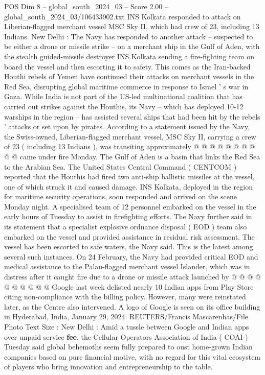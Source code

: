 \begin{textsample}{POS Dim 8 – global\_south\_2024\_03 – Score 2.00 – global\_south\_2024\_03/106433902.txt}  \label{ex:f8_pos_430}
INS Kolkata responded to attack on Liberian-flagged merchant vessel MSC Sky II, which had crew of 23, including 13 Indians.
New Delhi : The Navy has responded to another attack -- suspected to be either a drone or missile strike -- on a merchant ship in the Gulf of Aden, with the stealth guided-missile destroyer INS Kolkata sending a fire-fighting team on board the vessel and then escorting it to safety.
This comes as the Iran-backed Houthi rebels of Yemen have continued their attacks on merchant vessels in the Red Sea, disrupting global maritime commerce in response to Israel ' s war in Gaza.
While India is not part of the US-led multinational coalition that has carried out strikes against the Houthis, its Navy -- which has deployed 10-12 warships in the region -- has assisted several ships that had been hit by the rebels ' attacks or set upon by pirates.
According to a statement issued by the Navy, the Swiss-owned, Liberian-flagged merchant vessel, MSC Sky II, carrying a crew of 23 ( including 13 Indians ), was transiting approximately @ @ @ @ @ @ @ @ @ @ came under fire Monday.
The Gulf of Aden is a basin that links the Red Sea to the Arabian Sea.
The United States Central Command ( CENTCOM ) reported that the Houthis had fired two anti-ship ballistic missiles at the vessel, one of which struck it and caused damage.
INS Kolkata, deployed in the region for maritime security operations, soon responded and arrived on the scene Monday night.
A specialised team of 12 personnel embarked on the vessel in the early hours of Tuesday to assist in firefighting efforts.
The Navy further said in its statement that a specialist explosive ordnance disposal ( EOD ) team also embarked on the vessel and provided assistance in residual risk assessment.
The vessel has been escorted to safe waters, the Navy said.
This is the latest among several such instances.
On 24 February, the Navy had provided critical EOD and medical assistance to the Palau-flagged merchant vessel Islander, which was in distress after it caught fire due to a drone or missile attack launched by @ @ @ @ @ @ @ @ @ @ Google last week delisted nearly 10 Indian apps from Play Store citing non-compliance with the billing policy.
However, many were reinstated later, as the Centre also intervened.
A logo of Google is seen on its office building in Hyderabad, India, January 29, 2024.
REUTERS/Francis Mascarenhas/File Photo Text Size : New Delhi : Amid a tussle between Google and Indian apps over unpaid service \textbf{fee}, the Cellular Operators Association of India ( COAI ) Tuesday said global behemoths seem fully prepared to oust home-grown Indian companies based on pure financial motive, with no regard for this vital ecosystem of players who bring innovation and entrepreneurship to the table.

\end{textsample}
